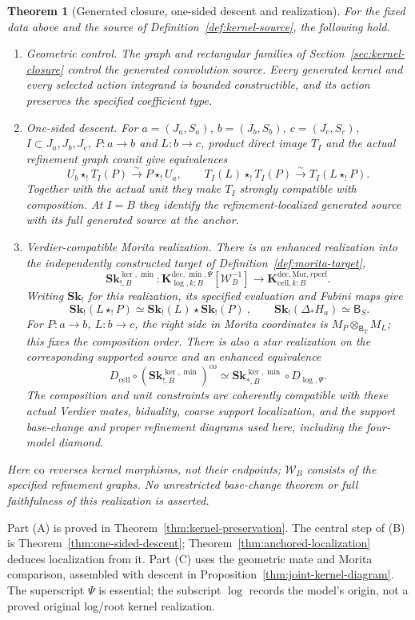 \documentclass[11pt]{article}
\newtheorem{theorem}[proposition]{Theorem}
\theoremstyle{definition}
\theoremstyle{remark}
\newcommand{\Sk}{\mathbf{Sk}}
\begin{document}
\begin{theorem}[Generated closure, one-sided descent and realization]
\label{thm:main}
For the fixed data above and the source of
Definition~\ref{def:kernel-source}, the following hold.
\begin{enumerate}
\item[\textup{(A)}] \emph{Geometric control.}
The graph and rectangular families of
Section~\ref{sec:kernel-closure} control the generated convolution
source.  Every generated kernel and every selected action integrand
is bounded constructible, and its action preserves the specified
coefficient type.
\item[\textup{(B)}] \emph{One-sided descent.}
For $a=(J_a,S_a)$, $b=(J_b,S_b)$, $c=(J_c,S_c)$,
$I\subset J_a,J_b,J_c$, $P:a\to b$ and $L:b\to c$,
product direct image $T_I$ and the
actual refinement graph counit give equivalences
\[
 U_b\star_!T_I(P)\xrightarrow{\sim}P\star_!U_a,
 \qquad
 T_I(L)\star_!T_I(P)\xrightarrow{\sim}T_I(L\star_!P).
\]
Together with the actual unit they make $T_I$ strongly compatible
with composition.  At $I=B$ they identify the refinement-localized
generated source with its full generated source at the anchor.
\item[\textup{(C)}] \emph{Verdier-compatible Morita realization.}
There is an enhanced realization into the independently constructed
target of Definition~\ref{def:morita-target},
\[
 \Sk^{\ker,\min}_{!,B}:
 \mathbf K_{\log,k;B}^{\mathrm{dec},\min,\Psi}
       [\mathcal W_B^{-1}]
 \longrightarrow
 \mathbf K_{\mathrm{cell},k;B}^{\mathrm{dec},\mathrm{Mor},r\mathrm{perf}}.
\]
Writing $\Sk_!$ for this realization, its specified evaluation and
Fubini maps give
\begin{equation}
 \boxed{\ \Sk_!(L\star_!P)\simeq
                   \Sk_!(L)\star\Sk_!(P)\ },\qquad
 \Sk_!(\Delta_*H_a)\simeq\mathsf B_S.
 \label{eq:main-strong-realization}
\end{equation}
For $P:a\to b$, $L:b\to c$, the right side in Morita coordinates
is $M_P\otimes_{\mathsf B_T}M_L$; this fixes the composition order.
There is also a star realization on the corresponding supported
source and an enhanced equivalence
\[
 D_{\mathrm{cell}}\circ(\Sk^{\ker,\min}_{!,B})^{\mathrm{co}}
 \simeq \Sk^{\ker,\min}_{*,B}\circ D_{\log,\Psi}.
\]
The composition and unit constraints are coherently compatible with
these actual Verdier mates, biduality, coarse support localization,
and the support base-change and proper refinement diagrams used
here, including the four-model diamond.
\end{enumerate}
Here $\mathrm{co}$ reverses kernel morphisms, not their endpoints;
$\mathcal W_B$ consists of the specified refinement graphs.  No
unrestricted base-change theorem or full faithfulness of this
realization is asserted.
\end{theorem}
Part (A) is proved in Theorem~\ref{thm:kernel-preservation}.
The central step of (B) is Theorem~\ref{thm:one-sided-descent};
Theorem~\ref{thm:anchored-localization} deduces localization from it.
Part (C) uses the geometric mate and Morita comparison, assembled
with descent in Proposition~\ref{thm:joint-kernel-diagram}.
The superscript $\Psi$ is essential; the subscript $\log$ records
the model's origin, not a proved original log/root kernel realization.
\end{document}
